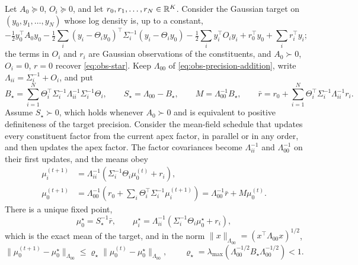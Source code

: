 Let \(A_0\succeq0\), \(O_i\succeq0\), and let \(r_0,r_1,\dots,r_N\in\mathbb R^K\). Consider the
Gaussian target on \((y_0,y_1,\dots,y_N)\) whose log density is, up to a constant,
\[
-\tfrac12y_0^\top A_0y_0
-\tfrac12\sum_i(y_i-\Theta_iy_0)^\top\Sigma_i^{-1}(y_i-\Theta_iy_0)
-\tfrac12\sum_iy_i^\top O_iy_i
+r_0^\top y_0+\sum_ir_i^\top y_i ;
\]
the terms in \(O_i\) and \(r_i\) are Gaussian observations of the constituents, and
\(A_0\succ0\), \(O_i=0\), \(r=0\) recover \eqref{eq:obs-star}. Keep \(\Lambda_{00}\) of
\eqref{eq:obs-precision-addition}, write \(\Lambda_{ii}=\Sigma_i^{-1}+O_i\), and put
\begin{equation}
B_\star=\sum_{i=1}^N\Theta_i^\top\Sigma_i^{-1}\Lambda_{ii}^{-1}\Sigma_i^{-1}\Theta_i,
\qquad
S_\star=\Lambda_{00}-B_\star,
\qquad
M=\Lambda_{00}^{-1}B_\star,
\qquad
\bar r=r_0+\sum_{i=1}^N\Theta_i^\top\Sigma_i^{-1}\Lambda_{ii}^{-1}r_i .
\label{eq:obs-star-contraction-data}
\end{equation}
Assume \(S_\star\succ0\), which holds whenever \(A_0\succ0\) and is equivalent to positive
definiteness of the target precision. Consider the mean-field schedule that updates every
constituent factor from the current apex factor, in parallel or in any order, and then
updates the apex factor. The factor covariances become \(\Lambda_{ii}^{-1}\) and
\(\Lambda_{00}^{-1}\) on their first updates, and the means obey
\begin{align}
\mu_i^{(t+1)}
&=\Lambda_{ii}^{-1}\left(\Sigma_i^{-1}\Theta_i\mu_0^{(t)}+r_i\right),
\label{eq:obs-star-constituent-update}\\
\mu_0^{(t+1)}
&=\Lambda_{00}^{-1}\left(r_0+\sum_i\Theta_i^\top\Sigma_i^{-1}\mu_i^{(t+1)}\right)
=\Lambda_{00}^{-1}\bar r+M\mu_0^{(t)}.
\label{eq:obs-star-apex-update}
\end{align}
There is a unique fixed point,
\begin{equation}
\mu_0^\star=S_\star^{-1}\bar r,
\qquad
\mu_i^\star=\Lambda_{ii}^{-1}\left(\Sigma_i^{-1}\Theta_i\mu_0^\star+r_i\right),
\label{eq:obs-star-fixed-point}
\end{equation}
which is the exact mean of the target, and in the norm
\(\lVert x\rVert_{\Lambda_{00}}=(x^\top\Lambda_{00}x)^{1/2}\),
\begin{equation}
\lVert\mu_0^{(t+1)}-\mu_0^\star\rVert_{\Lambda_{00}}
\leq\varrho_\star
\lVert\mu_0^{(t)}-\mu_0^\star\rVert_{\Lambda_{00}},
\qquad
\varrho_\star=\lambda_{\max}\left(\Lambda_{00}^{-1/2}B_\star\Lambda_{00}^{-1/2}\right)<1 .
\label{eq:obs-star-rate}
\end{equation}
